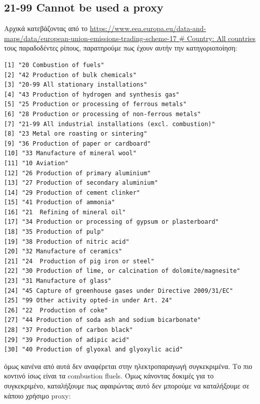 \documentclass[a4paper,twoside,10pt]{article}
\begin{document}
\subsection{21-99 Cannot be used a proxy}
Αρχικά κατεβάζοντας από το \url{https://www.eea.europa.eu/data-and-maps/data/european-union-emissions-trading-scheme-17  # Country: All countries
} τους παραδοδέντες ρίπους, παρατηρούμε πως έχουν αυτήν την κατηγοριοποίηση:
\begin{verbatim}
[1] "20 Combustion of fuels"                                     
[2] "42 Production of bulk chemicals"                            
[3] "20-99 All stationary installations"                         
[4] "43 Production of hydrogen and synthesis gas"                
[5] "25 Production or processing of ferrous metals"              
[6] "28 Production or processing of non-ferrous metals"          
[7] "21-99 All industrial installations (excl. combustion)"      
[8] "23 Metal ore roasting or sintering"                         
[9] "36 Production of paper or cardboard"                        
[10] "33 Manufacture of mineral wool"                             
[11] "10 Aviation"                                                
[12] "26 Production of primary aluminium"                         
[13] "27 Production of secondary aluminium"                       
[14] "29 Production of cement clinker"                            
[15] "41 Production of ammonia"                                   
[16] "21  Refining of mineral oil"                                
[17] "34 Production or processing of gypsum or plasterboard"      
[18] "35 Production of pulp"                                      
[19] "38 Production of nitric acid"                               
[20] "32 Manufacture of ceramics"                                 
[21] "24  Production of pig iron or steel"                        
[22] "30 Production of lime, or calcination of dolomite/magnesite"
[23] "31 Manufacture of glass"                                    
[24] "45 Capture of greenhouse gases under Directive 2009/31/EC"  
[25] "99 Other activity opted-in under Art. 24"                   
[26] "22  Production of coke"                                     
[27] "44 Production of soda ash and sodium bicarbonate"           
[28] "37 Production of carbon black"                              
[29] "39 Production of adipic acid"                               
[30] "40 Production of glyoxal and glyoxylic acid"  
\end{verbatim}
όμως κανένα από αυτά δεν αναφέρεται στην ηλεκτροπαραγωγή συγκεκριμένα. Το πιο κοντινό ίσως είναι τα combustion fluels. Όμως κάνοντας δοκιμές για το συγκεκριμένο, καταλήξουμε πως αφαιρώντας αυτό δεν μπορούμε να καταλήξουμε σε κάποιο χρήσιμο proxy:
\end{document}
